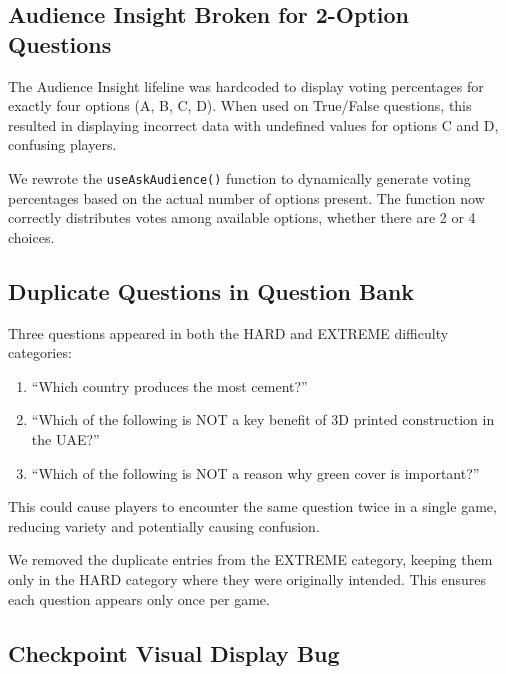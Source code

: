 \documentclass[11pt,a4paper]{article}
\begin{document}
\subsection{Audience Insight Broken for 2-Option Questions}

\begin{issuebox}
The Audience Insight lifeline was hardcoded to display voting percentages for exactly four options (A, B, C, D). When used on True/False questions, this resulted in displaying incorrect data with undefined values for options C and D, confusing players.
\end{issuebox}

\begin{fixbox}
We rewrote the \texttt{useAskAudience()} function to dynamically generate voting percentages based on the actual number of options present. The function now correctly distributes votes among available options, whether there are 2 or 4 choices.
\end{fixbox}

\subsection{Duplicate Questions in Question Bank}

\begin{issuebox}
Three questions appeared in both the HARD and EXTREME difficulty categories:
\begin{enumerate}
    \item ``Which country produces the most cement?''
    \item ``Which of the following is NOT a key benefit of 3D printed construction in the UAE?''
    \item ``Which of the following is NOT a reason why green cover is important?''
\end{enumerate}
This could cause players to encounter the same question twice in a single game, reducing variety and potentially causing confusion.
\end{issuebox}

\begin{fixbox}
We removed the duplicate entries from the EXTREME category, keeping them only in the HARD category where they were originally intended. This ensures each question appears only once per game.
\end{fixbox}

\subsection{Checkpoint Visual Display Bug}
\end{document}
